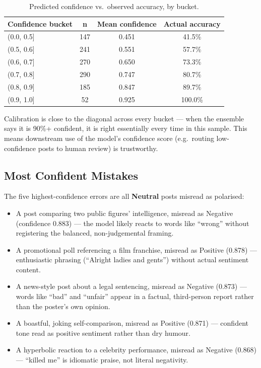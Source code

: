 \documentclass[11pt,a4paper]{article}
\begin{document}
\begin{table}[H]
\centering
\small
\begin{tabular}{@{}lccc@{}}
\toprule
\textbf{Confidence bucket} & \textbf{n} & \textbf{Mean confidence} & \textbf{Actual accuracy} \\
\midrule
(0.0, 0.5] & 147 & 0.451 & 41.5\% \\
(0.5, 0.6] & 241 & 0.551 & 57.7\% \\
(0.6, 0.7] & 270 & 0.650 & 73.3\% \\
(0.7, 0.8] & 290 & 0.747 & 80.7\% \\
(0.8, 0.9] & 185 & 0.847 & 89.7\% \\
(0.9, 1.0] & 52 & 0.925 & 100.0\% \\
\bottomrule
\end{tabular}
\caption{Predicted confidence vs.\ observed accuracy, by bucket.}
\end{table}

Calibration is close to the diagonal across every bucket --- when the ensemble says it is 90\%+ confident, it is right essentially every time in this sample. This means downstream use of the model's confidence score (e.g.\ routing low-confidence posts to human review) is trustworthy.

\subsection{Most Confident Mistakes}

The five highest-confidence errors are all \textbf{Neutral} posts misread as polarised:

\begin{itemize}[leftmargin=*, itemsep=2pt]
    \small
    \item A post comparing two public figures' intelligence, misread as Negative (confidence 0.883) --- the model likely reacts to words like ``wrong'' without registering the balanced, non-judgemental framing.
    \item A promotional poll referencing a film franchise, misread as Positive (0.878) --- enthusiastic phrasing (``Alright ladies and gents'') without actual sentiment content.
    \item A news-style post about a legal sentencing, misread as Negative (0.873) --- words like ``bad'' and ``unfair'' appear in a factual, third-person report rather than the poster's own opinion.
    \item A boastful, joking self-comparison, misread as Positive (0.871) --- confident tone read as positive sentiment rather than dry humour.
    \item A hyperbolic reaction to a celebrity performance, misread as Negative (0.868) --- ``killed me'' is idiomatic praise, not literal negativity.
\end{itemize}
\end{document}
